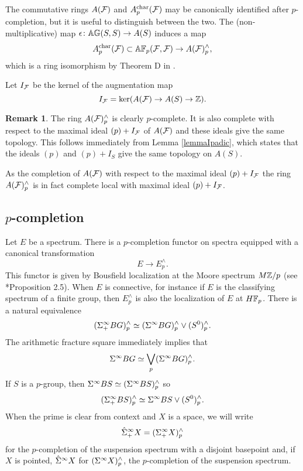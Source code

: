 \documentclass[10pt]{amsart}
\theoremstyle{definition}
\newtheorem{remark}[theorem]{Remark}
\begin{document}
The commutative rings $A(\mathcal{F})$ and $A_{p}^{\text{char}}(\mathcal{F})$ may be canonically identified after $p$-completion, but it is useful to distinguish between the two. The (non-multiplicative) map $\epsilon \colon \mathbb{A} \mathbb{G}(S,S) \rightarrow A(S)$ induces a map
\[
A_{p}^{\text{char}}(\mathcal{F}) \subset \mathbb{A} \mathbb{F}_p(\mathcal{F},\mathcal{F}) \rightarrow A(\mathcal{F})^{\wedge}_{p},
\]
which is a ring isomorphism by Theorem D in \cite{ReehIdempotent}.

Let $I_{\mathcal{F}}$ be the kernel of the augmentation map
\[
I_{\mathcal{F}} = \ker(A(\mathcal{F}) \rightarrow A(S) \rightarrow \mathbb{Z}).
\]
\begin{remark}\label{AFLocal}
The ring $A(\mathcal{F})^{\wedge}_{p}$ is clearly $p$-complete. It is also complete with respect to the maximal ideal $(p)+I_{\mathcal{F}}$ of $A(\mathcal{F})$ and these ideals give the same topology. This follows immediately from Lemma \ref{lemmaIpadic}, which states that the ideals $(p)$ and $(p)+I_S$ give the same topology on $A(S)$.

As the completion of $A(\mathcal{F})$ with respect to the maximal ideal $(p)+I_{\mathcal{F}}$ the ring $A(\mathcal{F})^{\wedge}_{p}$ is in fact complete local with maximal ideal $(p)+I_{\mathcal{F}}$.
\end{remark}


\subsection{$p$-completion}

Let $E$ be a spectrum. There is a $p$-completion functor on spectra equipped with a canonical transformation
\[
E \rightarrow E^{\wedge}_{p}.
\]
This functor is given by Bousfield localization at the Moore spectrum $M\mathbb{Z}/p$ (see \cite{Bousfield2}*{Proposition 2.5}). When $E$ is connective, for instance if $E$ is the classifying spectrum of a finite group, then $E^{\wedge}_{p}$ is also the localization of $E$ at $H\mathbb{F}_p$. There is a natural equivalence
\[
(\Sigma^{\infty}_{+} BG)^{\wedge}_{p} \simeq (\Sigma^{\infty} BG)^{\wedge}_{p} \vee (S^0)^{\wedge}_{p}.
\]
The arithmetic fracture square immediately implies that
\[
\Sigma^{\infty} BG \simeq \bigvee_p (\Sigma^{\infty} BG)^{\wedge}_p.
\]
If $S$ is a $p$-group, then $\Sigma^{\infty} BS \simeq (\Sigma^{\infty} BS)^{\wedge}_{p}$ so
\[
(\Sigma^{\infty}_{+} BS)^{\wedge}_{p} \simeq \Sigma^{\infty} BS \vee (S^0)^{\wedge}_{p}.
\]
When the prime is clear from context and $X$ is a space, we will write
\[
\hat{\Sigma}^{\infty}_{+} X = (\Sigma^{\infty}_{+} X)^{\wedge}_{p}
\]
for the $p$-completion of the suspension spectrum with a disjoint basepoint and, if $X$ is pointed, $\hat{\Sigma}^{\infty} X$ for $(\Sigma^{\infty} X)^{\wedge}_{p}$, the $p$-completion of the suspension spectrum.
\end{document}
